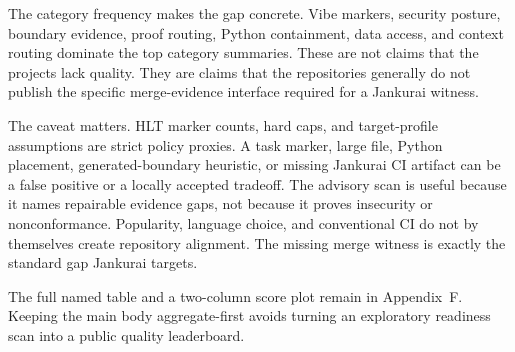 \PublicRepoWeakDimensionTable

The category frequency makes the gap concrete. Vibe markers, security posture, boundary evidence, proof routing, Python containment, data access, and context routing dominate the top category summaries. These are not claims that the projects lack quality. They are claims that the repositories generally do not publish the specific merge-evidence interface required for a Jankurai witness.

The caveat matters. HLT marker counts, hard caps, and target-profile assumptions are strict policy proxies. A task marker, large file, Python placement, generated-boundary heuristic, or missing Jankurai CI artifact can be a false positive or a locally accepted tradeoff. The advisory scan is useful because it names repairable evidence gaps, not because it proves insecurity or nonconformance. Popularity, language choice, and conventional CI do not by themselves create repository alignment. The missing merge witness is exactly the standard gap Jankurai targets.

The full named table and a two-column score plot remain in Appendix~F. Keeping the main body aggregate-first avoids turning an exploratory readiness scan into a public quality leaderboard.
